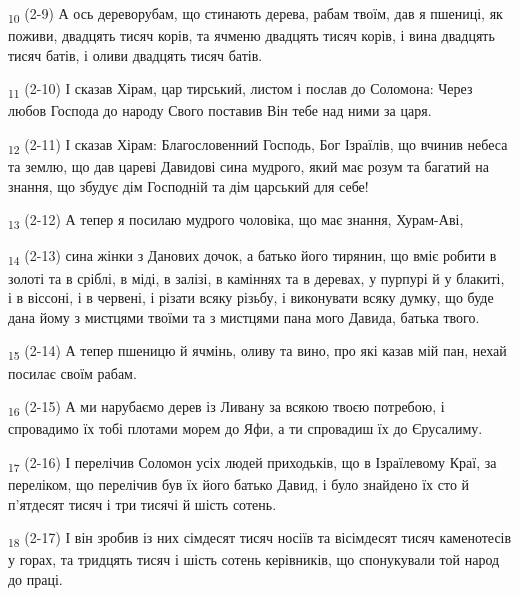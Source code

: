 \begin{tcolorbox}
\textsubscript{10} (2-9) А ось дереворубам, що стинають дерева, рабам твоїм, дав я пшениці, як поживи, двадцять тисяч корів, та ячменю двадцять тисяч корів, і вина двадцять тисяч батів, і оливи двадцять тисяч батів.
\end{tcolorbox}
\begin{tcolorbox}
\textsubscript{11} (2-10) І сказав Хірам, цар тирський, листом і послав до Соломона: Через любов Господа до народу Свого поставив Він тебе над ними за царя.
\end{tcolorbox}
\begin{tcolorbox}
\textsubscript{12} (2-11) І сказав Хірам: Благословенний Господь, Бог Ізраїлів, що вчинив небеса та землю, що дав цареві Давидові сина мудрого, який має розум та багатий на знання, що збудує дім Господній та дім царський для себе!
\end{tcolorbox}
\begin{tcolorbox}
\textsubscript{13} (2-12) А тепер я посилаю мудрого чоловіка, що має знання, Хурам-Аві,
\end{tcolorbox}
\begin{tcolorbox}
\textsubscript{14} (2-13) сина жінки з Данових дочок, а батько його тирянин, що вміє робити в золоті та в сріблі, в міді, в залізі, в каміннях та в деревах, у пурпурі й у блакиті, і в віссоні, і в червені, і різати всяку різьбу, і виконувати всяку думку, що буде дана йому з мистцями твоїми та з мистцями пана мого Давида, батька твого.
\end{tcolorbox}
\begin{tcolorbox}
\textsubscript{15} (2-14) А тепер пшеницю й ячмінь, оливу та вино, про які казав мій пан, нехай посилає своїм рабам.
\end{tcolorbox}
\begin{tcolorbox}
\textsubscript{16} (2-15) А ми нарубаємо дерев із Ливану за всякою твоєю потребою, і спровадимо їх тобі плотами морем до Яфи, а ти спровадиш їх до Єрусалиму.
\end{tcolorbox}
\begin{tcolorbox}
\textsubscript{17} (2-16) І перелічив Соломон усіх людей приходьків, що в Ізраїлевому Краї, за переліком, що перелічив був їх його батько Давид, і було знайдено їх сто й п'ятдесят тисяч і три тисячі й шість сотень.
\end{tcolorbox}
\begin{tcolorbox}
\textsubscript{18} (2-17) І він зробив із них сімдесят тисяч носіїв та вісімдесят тисяч каменотесів у горах, та тридцять тисяч і шість сотень керівників, що спонукували той народ до праці.
\end{tcolorbox}
